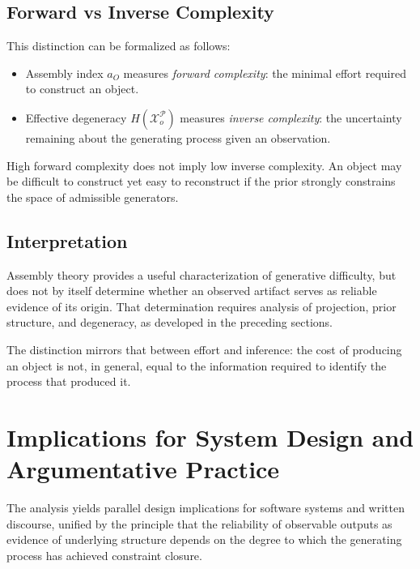 \documentclass[12pt, oneside]{article}
\theoremstyle{plain}
\theoremstyle{definition}
\theoremstyle{remark}
\newcommand{\config}{\mathcal{X}}
\newcommand{\prior}{\mathcal{P}}
\begin{document}
\subsection{Forward vs Inverse Complexity}

This distinction can be formalized as follows:

\begin{itemize}[leftmargin=2em]
\item Assembly index $a_O$ measures \emph{forward complexity}: the minimal effort
required to construct an object.
\item Effective degeneracy $H(\config_o^{\prior})$ measures \emph{inverse complexity}:
the uncertainty remaining about the generating process given an observation.
\end{itemize}

High forward complexity does not imply low inverse complexity. An object may be
difficult to construct yet easy to reconstruct if the prior strongly constrains
the space of admissible generators.

\subsection{Interpretation}

Assembly theory provides a useful characterization of generative difficulty, but
does not by itself determine whether an observed artifact serves as reliable
evidence of its origin. That determination requires analysis of projection,
prior structure, and degeneracy, as developed in the preceding sections.

The distinction mirrors that between effort and inference: the cost of producing
an object is not, in general, equal to the information required to identify the
process that produced it.

\section{Implications for System Design and Argumentative Practice}

The analysis yields parallel design implications for software systems and written discourse,
unified by the principle that the reliability of observable outputs as evidence of underlying
structure depends on the degree to which the generating process has achieved constraint
closure.
\end{document}
